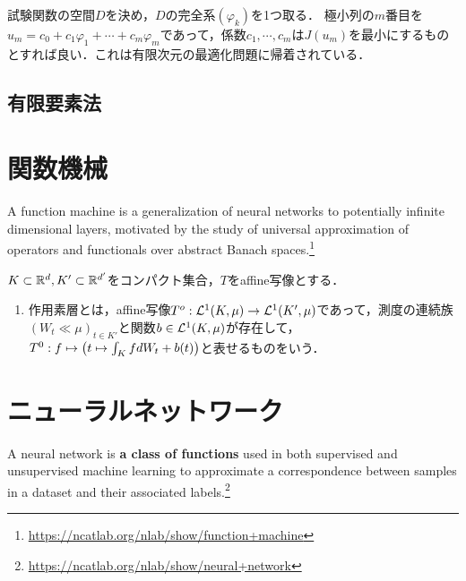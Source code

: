 \documentclass[uplatex,dvipdfmx]{jsreport}
\begin{document}
\begin{example}
    試験関数の空間$D$を決め，$D$の完全系$(\varphi_k)$を1つ取る．
    極小列の$m$番目を$u_m=c_0+c_1\varphi_1+\cdots+c_m\varphi_m$であって，係数$c_1,\cdots,c_m$は$J(u_m)$を最小にするものとすれば良い．これは有限次元の最適化問題に帰着されている．
\end{example}

\subsection{有限要素法}



\section{関数機械}

\begin{tcolorbox}[colframe=ForestGreen, colback=ForestGreen!10!white,breakable,colbacktitle=ForestGreen!40!white,coltitle=black,fonttitle=\bfseries\sffamily,
title=]
A function machine is a generalization of neural networks to potentially infinite dimensional layers, motivated by the study of universal approximation of operators and functionals over abstract Banach spaces.\footnote{\url{https://ncatlab.org/nlab/show/function+machine}}
\end{tcolorbox}

\begin{definition}
    $K\subset\mathbb{R}^d,K'\subset\mathbb{R}^{d'}$をコンパクト集合，$T$をaffine写像とする．
    \begin{enumerate}
        \item 作用素層とは，affine写像$T^o:\mathcal{L}^1(K,\mu)\to\mathcal{L}^1(K',\mu)$であって，測度の連続族$(W_t\ll\mu)_{t\in K'}$と関数$b\in\mathcal{L}^1(K,\mu)$が存在して，$T^0:f\mapsto\left(t\mapsto\int_KfdW_t+b(t)\right)$と表せるものをいう．
    \end{enumerate}
\end{definition}

\section{ニューラルネットワーク}

\begin{tcolorbox}[colframe=ForestGreen, colback=ForestGreen!10!white,breakable,colbacktitle=ForestGreen!40!white,coltitle=black,fonttitle=\bfseries\sffamily,
title=]
A neural network is \textbf{a class of functions} used in both supervised and unsupervised machine learning to approximate a correspondence between samples in a dataset and their associated labels.\footnote{\url{https://ncatlab.org/nlab/show/neural+network}}
\end{tcolorbox}
\end{document}
